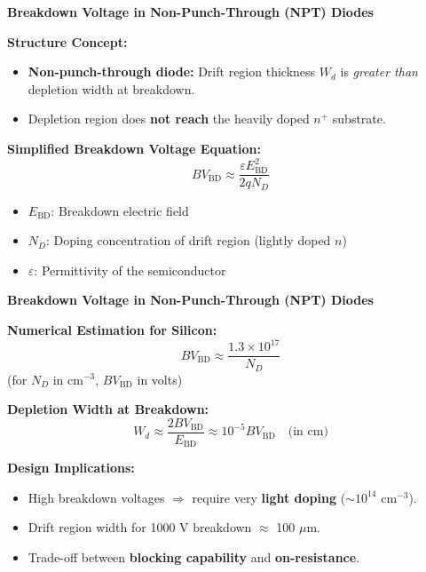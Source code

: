 \begin{frame}{\textbf{Breakdown Voltage in Non-Punch-Through (NPT) Diodes}}

    \textbf{Structure Concept:}
    \begin{itemize}
        \item \textbf{Non-punch-through diode:} Drift region thickness $W_d$ is \textit{greater than} depletion width at breakdown.
        \item Depletion region does \textbf{not reach} the heavily doped $n^+$ substrate.
    \end{itemize}
    
    \vspace{0.4em}
    \textbf{Simplified Breakdown Voltage Equation:}
    \begin{equation}
        BV_{\text{BD}} \approx \frac{\varepsilon E_{\text{BD}}^2}{2 q N_D}
    \end{equation}
    \begin{itemize}
        \item $E_{\text{BD}}$: Breakdown electric field
        \item $N_D$: Doping concentration of drift region (lightly doped $n$)
        \item $\varepsilon$: Permittivity of the semiconductor
    \end{itemize}
    
\end{frame}

\begin{frame}{\textbf{Breakdown Voltage in Non-Punch-Through (NPT) Diodes}}

\textbf{Numerical Estimation for Silicon:}
\begin{equation}
    BV_{\text{BD}} \approx \frac{1.3 \times 10^{17}}{N_D}
\end{equation}
(for $N_D$ in $\text{cm}^{-3}$, $BV_{\text{BD}}$ in volts)

\vspace{0.4em}
\textbf{Depletion Width at Breakdown:}
\begin{equation}
    W_d \approx \frac{2 BV_{\text{BD}}}{E_{\text{BD}}} \approx 10^{-5} BV_{\text{BD}} \quad \text{(in cm)}
\end{equation}

\vspace{0.4em}
\textbf{Design Implications:}
\begin{itemize}
    \item High breakdown voltages $\Rightarrow$ require very \textbf{light doping} ($\sim 10^{14}$ cm$^{-3}$).
    \item Drift region width for 1000 V breakdown $\approx$ 100 $\mu$m.
    \item Trade-off between \textbf{blocking capability} and \textbf{on-resistance}.
\end{itemize}
\end{frame}

